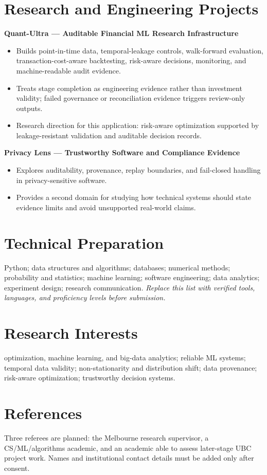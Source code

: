 \documentclass[11pt]{article}
\begin{document}
\section*{Research and Engineering Projects}
\textbf{Quant-Ultra --- Auditable Financial ML Research Infrastructure}
\begin{itemize}
\item Builds point-in-time data, temporal-leakage controls, walk-forward evaluation, transaction-cost-aware backtesting, risk-aware decisions, monitoring, and machine-readable audit evidence.
\item Treats stage completion as engineering evidence rather than investment validity; failed governance or reconciliation evidence triggers review-only outputs.
\item Research direction for this application: risk-aware optimization supported by leakage-resistant validation and auditable decision records.
\end{itemize}

\textbf{Privacy Lens --- Trustworthy Software and Compliance Evidence}
\begin{itemize}
\item Explores auditability, provenance, replay boundaries, and fail-closed handling in privacy-sensitive software.
\item Provides a second domain for studying how technical systems should state evidence limits and avoid unsupported real-world claims.
\end{itemize}

\section*{Technical Preparation}
Python; data structures and algorithms; databases; numerical methods; probability and statistics; machine learning; software engineering; data analytics; experiment design; research communication. \textit{Replace this list with verified tools, languages, and proficiency levels before submission.}

\section*{Research Interests}
optimization, machine learning, and big-data analytics; reliable ML systems; temporal data validity; non-stationarity and distribution shift; data provenance; risk-aware optimization; trustworthy decision systems.

\section*{References}
Three referees are planned: the Melbourne research supervisor, a CS/ML/algorithms academic, and an academic able to assess later-stage UBC project work. Names and institutional contact details must be added only after consent.
\end{document}
